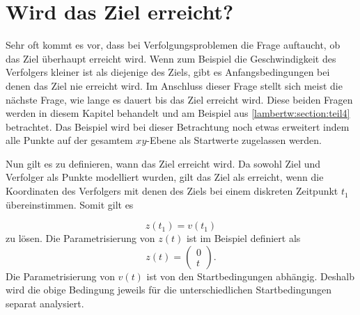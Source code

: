 %
%
%
\section{Wird das Ziel erreicht?
\label{lambertw:section:Wird_das_Ziel_erreicht}}

Sehr oft kommt es vor, dass bei Verfolgungsproblemen die Frage auftaucht, ob das Ziel überhaupt erreicht wird.
Wenn zum Beispiel die Geschwindigkeit des Verfolgers kleiner ist als diejenige des Ziels, gibt es Anfangsbedingungen bei denen das Ziel nie erreicht wird.
Im Anschluss dieser Frage stellt sich meist die nächste Frage, wie lange es dauert bis das Ziel erreicht wird.
Diese beiden Fragen werden in diesem Kapitel behandelt und am Beispiel aus \ref{lambertw:section:teil4} betrachtet.
Das Beispiel wird bei dieser Betrachtung noch etwas erweitert indem alle Punkte auf der gesamtem $xy$-Ebene als Startwerte zugelassen werden.

Nun gilt es zu definieren, wann das Ziel erreicht wird.
Da sowohl Ziel und Verfolger als Punkte modelliert wurden, gilt das Ziel als erreicht, wenn die Koordinaten des Verfolgers mit denen des Ziels bei einem diskreten Zeitpunkt $t_1$ übereinstimmen.
Somit gilt es

\begin{equation*}
    z(t_1)=v(t_1)
\end{equation*}
%
zu lösen.
Die Parametrisierung von $z(t)$ ist im Beispiel definiert als
\begin{equation}
    z(t)
    =
    \left( \begin{array}{c} 0 \\ t \end{array} \right)\text{.}
\end{equation}
%
Die Parametrisierung von $v(t)$ ist von den Startbedingungen abhängig. Deshalb wird die obige Bedingung jeweils für die unterschiedlichen Startbedingungen separat analysiert.

